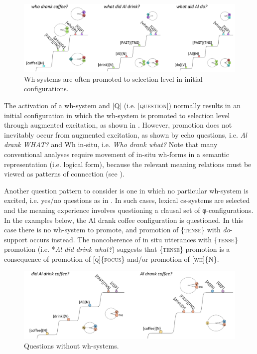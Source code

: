  
\begin{figure}
\includegraphics[width=\textwidth]{figures/Tilsen-img159.png}
\caption{Wh-systems are often promoted to selection level in initial configurations.}
\label{fig:7:15}
\end{figure}
 

  The activation of a wh-system and [Q] (i.e. [\textsc{question}]) normally results in an initial configuration in which the wh-system is promoted to selection level through augmented excitation, as shown in {}. However, promotion does not inevitably occur from augmented excitation, as shown by echo questions, i.e. \textit{Al drank WHAT?} and Wh in-situ, i.e. \textit{Who drank what?} Note that many conventional analyses require movement of in-situ wh-forms in a semantic representation (i.e. logical form), because the relevant meaning relations must be viewed as patterns of connection (see \citealt{Reinhart1998,Watanabe1992}).

  Another question pattern to consider is one in which no particular wh-system is excited, i.e. yes/no questions as in {}. In such cases, lexical cs-systems are selected and the meaning experience involves questioning a clausal set of φ-configurations. In the examples below, the {\textbar}Al drank coffee{\textbar} configuration is questioned. In this case there is no wh-system to promote, and promotion of \{\textsc{tense}\} with \textit{do}{}-support occurs instead. The noncoherence of in situ utterances with \{\textsc{tense}\} promotion (i.e. *\textit{Al did drink what?}) suggests that \{\textsc{tense}\} promotion is a consequence of promotion of [\textsc{q}]\{\textsc{focus}\} and/or promotion of [\textsc{wh}]\{N\}. 

  
\begin{figure}
\includegraphics[width=\textwidth]{figures/Tilsen-img160.png}
\caption{Questions without wh-systems.}
\label{fig:7:16}
\end{figure}
 

